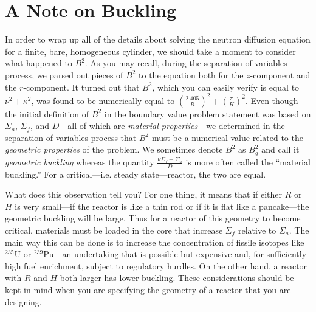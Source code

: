 \section{A Note on Buckling}
In order to wrap up all of the details about solving the neutron diffusion equation for a finite, bare, homogeneous cylinder, we should take a moment to consider what happened to $B^2$.  As you may recall, during the separation of variables process, we parsed out pieces of $B^2$ to the equation both for the $z$-component and the $r$-component.  It turned out that $B^2$, which you can easily verify is equal to $\nu^2 + \kappa^2$, was found to be numerically equal to $\left(\frac{2.405}{R} \right)^2 + \left(\frac{\pi}{H} \right)^2$.  Even though the initial definition of $B^2$ in the boundary value problem statement was based on $\Sigma_a$, $\Sigma_f$, and $D$---all of which are \emph{material properties}---we determined in the separation of variables process that $B^2$ must be a numerical value related to the \emph{geometric properties} of the problem.  We sometimes denote $B^2$ as $B_g^2$ and call it \emph{geometric buckling} whereas the quantity $\frac{\nu \Sigma_f - \Sigma_a}{D}$ is more often called the ``material buckling.''  For a critical---i.e. steady state---reactor, the two are equal. 

What does this observation tell you?  For one thing, it means that if either $R$ or $H$ is very small---if the reactor is like a thin rod or if it is flat like a pancake---the geometric buckling will be large.  Thus for a reactor of this geometry to become critical, materials must be loaded in the core that increase $\Sigma_f$ relative to $\Sigma_a$.  The main way this can be done is to increase the concentration of fissile isotopes like $^{235}\text{U}$ or $^{239}\text{Pu}$---an undertaking that is possible but expensive and, for sufficiently high fuel enrichment, subject to regulatory hurdles.  On the other hand, a reactor with $R$ and $H$ both larger has lower buckling. These considerations should be kept in mind when you are specifying the geometry of a reactor that you are designing.





